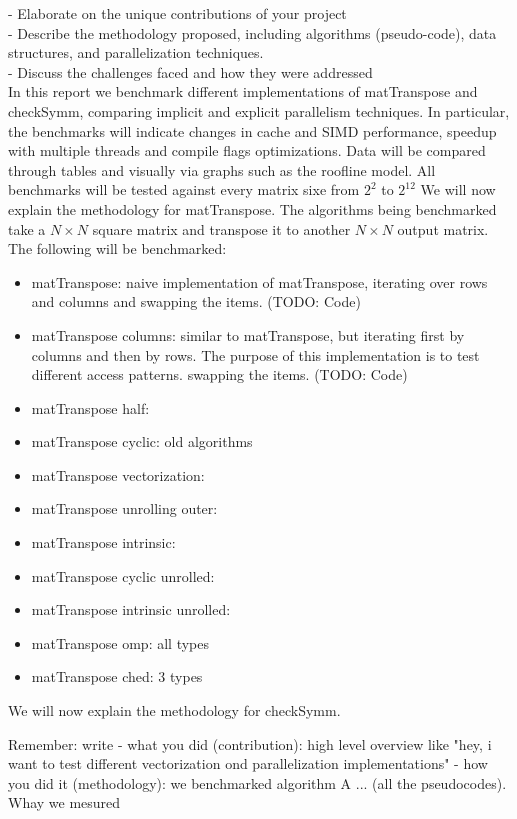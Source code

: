 \documentclass[conference]{IEEEtran}
\begin{document}
- Elaborate on the unique contributions of your project \\
- Describe the methodology proposed, including algorithms (pseudo-code),
data structures, and parallelization techniques. \\
- Discuss the challenges faced and how they were addressed \\

In this report we benchmark different implementations of matTranspose
and checkSymm, comparing implicit and explicit parallelism
techniques. In particular, the benchmarks will indicate changes in cache and SIMD performance,
speedup with multiple threads and compile flags optimizations. Data will be compared through tables
and visually via graphs such as the roofline model. All benchmarks
will be tested against every matrix sixe from $2^2$ to $2^{12}$
We will now explain the methodology for matTranspose.
The algorithms being benchmarked take a $N \times N$ square matrix and transpose it to another $N \times N$ output matrix.
The following will be benchmarked:
\begin{itemize}
\item matTranspose: naive implementation of matTranspose, iterating over rows and columns and
  swapping the items. (TODO: Code)
\item matTranspose columns: similar to matTranspose, but iterating first by columns and then by rows.
  The purpose of this implementation is to test different access patterns.
  swapping the items. (TODO: Code)
\item matTranspose half:
\item matTranspose cyclic:   old algorithms
\item matTranspose vectorization:
\item matTranspose unrolling outer:
\item matTranspose intrinsic:
\item matTranspose cyclic unrolled:
\item matTranspose intrinsic unrolled:
\item matTranspose omp:  all types
\item matTranspose ched: 3 types
\end{itemize}

We will now explain the methodology for checkSymm.

\iffalse
Remember: write
- what you did (contribution): high level overview like "hey, i want to test different vectorization ond parallelization implementations"
- how you did it (methodology): we benchmarked algorithm A ... (all the pseudocodes). Whay we mesured
\end{document}
